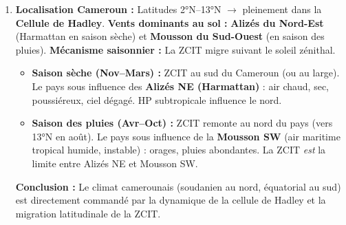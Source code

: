 \documentclass[11pt]{article}
\begin{document}
\begin{exoresolu}
\begin{enumerate}
\begin{itemize}
              \item \textbf{B (30°N) :} Air monté à l'équateur se refroidit en altitude, perd son humidité (précipitations équatoriales), descend par subsidence (mouvement descendant adiabatique $\rightarrow$ réchauffement par compression, assèchement) $\rightarrow$ accumulation d'air au sol $\rightarrow$ \textbf{Haute Pression (HP)} (Anticyclones subtropicaux, ex: Anticyclone des Açores). Déserts.
              \item \textbf{C (60°N) :} Rencontre de l'air doux/humide venu des subtropicales (vents d'Ouest) et de l'air froid polaire (vents d'Est polaires) $\rightarrow$ \textbf{Front polaire}. L'air chaud glisse sur l'air froid (front chaud) ou l'air froid soulève l'air chaud (front froid) $\rightarrow$ \textbf{montée forcée} $\rightarrow$ \textbf{Basse Pression (BP)} subpolaire. Dépressions tempérées.
              \item \textbf{D (Pôle) :} Rayonnement solaire nul/faible $\rightarrow$ fort refroidissement sol/air $\rightarrow$ air dense, lourd $\rightarrow$ \textbf{subsidence} $\rightarrow$ accumulation au sol $\rightarrow$ \textbf{Haute Pression (HP)} thermique polaire.
          \end{itemize}
    \item \textbf{Localisation Cameroun :} Latitudes 2°N--13°N $\rightarrow$ pleinement dans la \textbf{Cellule de Hadley}.
          \textbf{Vents dominants au sol :} \textbf{Alizés du Nord-Est} (Harmattan en saison sèche) et \textbf{Mousson du Sud-Ouest} (en saison des pluies).
          \textbf{Mécanisme saisonnier :} La ZCIT migre suivant le soleil zénithal.
          \begin{itemize}
              \item \textbf{Saison sèche (Nov--Mars) :} ZCIT au sud du Cameroun (ou au large). Le pays sous influence des \textbf{Alizés NE (Harmattan)} : air chaud, sec, poussiéreux, ciel dégagé. HP subtropicale influence le nord.
              \item \textbf{Saison des pluies (Avr--Oct) :} ZCIT remonte au nord du pays (vers 13°N en août). Le pays sous influence de la \textbf{Mousson SW} (air maritime tropical humide, instable) : orages, pluies abondantes. La ZCIT \emph{est} la limite entre Alizés NE et Mousson SW.
          \end{itemize}
          \textbf{Conclusion :} Le climat camerounais (soudanien au nord, équatorial au sud) est directement commandé par la dynamique de la cellule de Hadley et la migration latitudinale de la ZCIT.
\end{enumerate}
\end{exoresolu}
\end{document}
